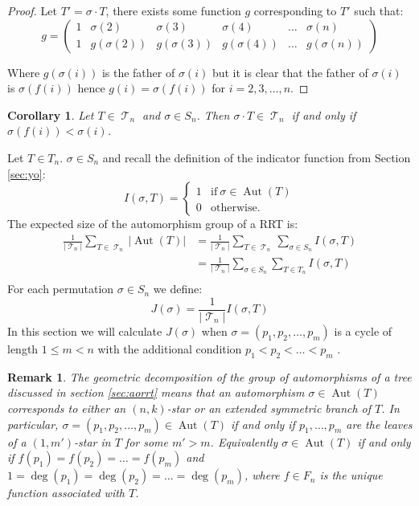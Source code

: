 \documentclass[oneside]{book} %
\newtheorem{remk}{Remark}
\newtheorem{cor}[thm]{Corollary}
\theoremstyle{definition}
\numberwithin{equation}{section}
\DeclareMathOperator{\Aut}{Aut} %
\DeclareMathOperator{\T}{\mathcal{T}}
\begin{document}
\begin{proof}
 Let $T' = \sigma \cdot T$, there exists some function $g$ corresponding to $T'$ such that:
 \[ g= \left(\begin{array}{cccccc}
     1& \sigma(2)&\sigma(3) &\sigma(4)& \dots & \sigma(n) \\
     1 & g(\sigma(2)) &g(\sigma(3)) &g(\sigma(4)) &\dots & g(\sigma(n))
    \end{array} \right)
\]

Where $g(\sigma(i))$ is the father of $\sigma(i)$ but it is clear that the father of $\sigma(i)$ is $\sigma(f(i))$  hence $g(i) = \sigma(f(i))$ for $i = 2,3,\dots,n$.  
\end{proof}

\begin{cor}\label{cor:sig}
Let $T \in \T_n$ and $ \sigma \in S_n$.  Then  $\sigma  \cdot T \in \T_n$ if and only if $\sigma(f(i)) < \sigma(i) $. 
\end{cor}


Let $T \in T_n$. $\sigma \in S_n$ and recall the definition of the indicator function from Section \ref{sec:yo}:
\[
 I(\sigma,T) = \begin{cases}
                1 & \text{if}\ \sigma \in \Aut(T) \\
                0 & \text{otherwise.}
               \end{cases}
\]
The expected size of the automorphism group of a RRT is:
\begin{align}
 \frac{1}{\lvert\T_n\rvert}\sum_{T \in \T_n} \lvert \Aut(T) \rvert &=  \frac{1}{\lvert\T_n\rvert}\sum_{T \in \T_n}\sum_{\sigma \in S_n}I(\sigma,T) \\
 &=   \frac{1}{\lvert\T_n\rvert}\sum_{\sigma \in S_n}\sum_{T \in T_n}I(\sigma,T) \\
\end{align}
For each permutation $\sigma \in S_n$ we define:
\[
 J(\sigma) = \frac{1}{\lvert \T_n \rvert}I(\sigma,T)
\]
In this section we will calculate $J(\sigma)$ when $\sigma = (p_1,p_2,\dots,p_m)$ is a cycle of length $1 \leq m<n$ with the additional condition $p_1< p_2<\dots< p_m$ .

\begin{remk}\label{remk:1}
 The geometric decomposition of the group of automorphisms of a tree discussed in section \ref{sec:aorrt} means that an
 automorphism $\sigma \in \Aut(T)$ corresponds to either an $(n,k)$-star or an extended symmetric branch of $T$.  In 
 particular, $\sigma = (p_1,p_2,\dots,p_m) \in \Aut(T)$ if and only if $p_1,\dots,p_m$ are the leaves of a $(1,m')$-star 
 in $T$ for some $m' > m$. Equivalently $\sigma \in \Aut(T)$ if and only if $f(p_1) = f(p_2) = \dots = f(p_m)$ and 
 $1 = \deg(p_1) = \deg(p_2) = \dots = \deg(p_m)$, where $f\in F_n$ is the unique function associated with $T$.   
\end{remk}
\end{document}
